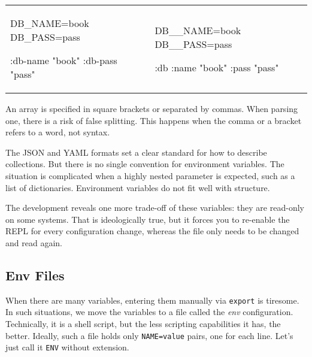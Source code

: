 \else

\begin{english}

\noindent
\begin{tabular}{ @{}p{5cm} @{}p{5cm} }

  \begin{clojure}
DB_NAME=book
DB_PASS=pass

{:db-name "book"
 :db-pass "pass"}
  \end{clojure}

&

  \begin{clojure}
DB__NAME=book
DB__PASS=pass

{:db {:name "book"
      :pass "pass"}}
  \end{clojure}

\end{tabular}

\end{english}

\fi


An array is specified in square brackets or separated by commas. When parsing one, there is a risk of false splitting. This happens when the comma or a bracket refers to a word, not syntax.


The JSON and YAML formats set a clear standard for how to describe collections. But there is no single convention for environment variables. The situation is complicated when a highly nested parameter is expected, such as a list of dictionaries. Environment variables do not fit well with structure.

The development reveals one more trade-off of these variables: they are read-only on some systems. That is ideologically true, but it forces you to re-enable the REPL for every configuration change, whereas the file only needs to be changed and read again.

\subsection{Env Files}


When there are many variables, entering them manually via \verb|export| is tiresome. In such situations, we move the variables to a file called the \emph{env} configuration. Technically, it is a shell script, but the less scripting capabilities it has, the better. Ideally, such a file holds only \verb|NAME=value| pairs, one for each line. Let's just call it \verb|ENV| without extension.

